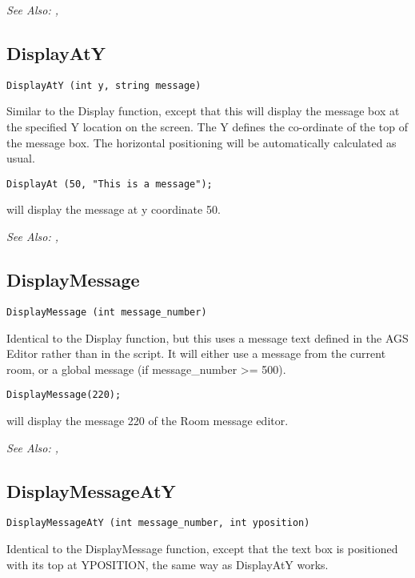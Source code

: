 \it{See Also:} , 

\subsection{DisplayAtY}\label{DisplayAtY}%

\begin{verbatim}
DisplayAtY (int y, string message)
\end{verbatim}
Similar to the Display function, except that this will display the message
box at the specified Y location on the screen. The Y defines the co-ordinate
of the top of the message box. The horizontal positioning will be
automatically calculated as usual.

\begin{verbatim}
DisplayAt (50, "This is a message");
\end{verbatim}
will display the message at y coordinate 50.

\it{See Also:} , 

\subsection{DisplayMessage}\label{DisplayMessage}%

\begin{verbatim}
DisplayMessage (int message_number)
\end{verbatim}
Identical to the Display function, but this uses a message text defined in
the AGS Editor rather than in the script. It will either use a message
from the current room, or a global message (if message_number >= 500).

\begin{verbatim}
DisplayMessage(220);
\end{verbatim}
will display the message 220 of the Room message editor.

\it{See Also:} , 


\subsection{DisplayMessageAtY}\label{DisplayMessageAtY}%

\begin{verbatim}
DisplayMessageAtY (int message_number, int yposition)
\end{verbatim}
Identical to the DisplayMessage function, except that the text box
is positioned with its top at YPOSITION, the same way as DisplayAtY
works.

